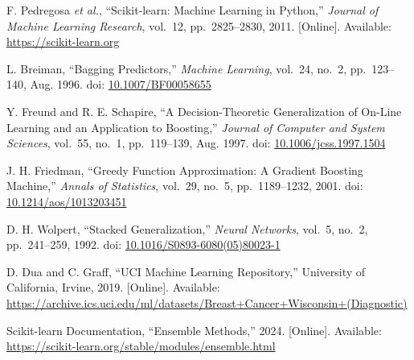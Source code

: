 \documentclass[12pt,a4paper]{article}
\begin{document}
\begin{enumerate}[label={[\arabic*]},leftmargin=*]

\item F. Pedregosa \textit{et al.}, ``Scikit-learn: Machine Learning in Python,''
  \textit{Journal of Machine Learning Research}, vol.\ 12, pp.\ 2825--2830, 2011.
  [Online]. Available: \url{https://scikit-learn.org}

\item L. Breiman, ``Bagging Predictors,'' \textit{Machine Learning}, vol.\ 24, no.\ 2,
  pp.\ 123--140, Aug. 1996.
  doi: \href{https://doi.org/10.1007/BF00058655}{10.1007/BF00058655}

\item Y. Freund and R. E. Schapire, ``A Decision-Theoretic Generalization of On-Line Learning
  and an Application to Boosting,'' \textit{Journal of Computer and System Sciences},
  vol.\ 55, no.\ 1, pp.\ 119--139, Aug. 1997.
  doi: \href{https://doi.org/10.1006/jcss.1997.1504}{10.1006/jcss.1997.1504}

\item J. H. Friedman, ``Greedy Function Approximation: A Gradient Boosting Machine,''
  \textit{Annals of Statistics}, vol.\ 29, no.\ 5, pp.\ 1189--1232, 2001.
  doi: \href{https://doi.org/10.1214/aos/1013203451}{10.1214/aos/1013203451}

\item D. H. Wolpert, ``Stacked Generalization,'' \textit{Neural Networks},
  vol.\ 5, no.\ 2, pp.\ 241--259, 1992.
  doi: \href{https://doi.org/10.1016/S0893-6080(05)80023-1}{10.1016/S0893-6080(05)80023-1}

\item D. Dua and C. Graff, ``UCI Machine Learning Repository,''
  University of California, Irvine, 2019.
  [Online]. Available: \url{https://archive.ics.uci.edu/ml/datasets/Breast+Cancer+Wisconsin+(Diagnostic)}

\item Scikit-learn Documentation, ``Ensemble Methods,'' 2024.
  [Online]. Available: \url{https://scikit-learn.org/stable/modules/ensemble.html}

\end{enumerate}
\end{document}
